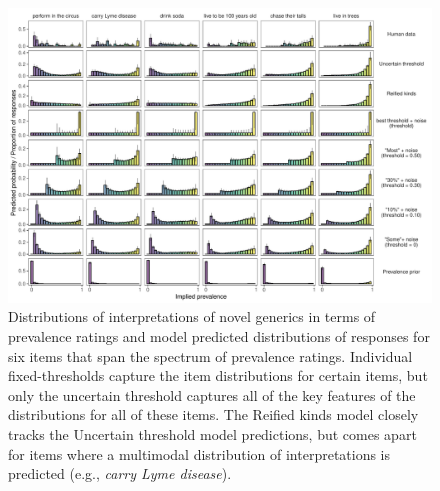 \documentclass[floatsintext,doc]{apa6}
\begin{document}
\begin{figure}
\centering
\includegraphics{figs/genint-fullDistributions-variousFixeds-1.pdf}
\caption{Distributions of interpretations of novel generics in terms of prevalence ratings and model predicted distributions of responses for six items that span the spectrum of prevalence ratings. Individual fixed-thresholds capture the item distributions for certain items, but only the uncertain threshold captures all of the key features of the distributions for all of these items. The Reified kinds model closely tracks the Uncertain threshold model predictions, but comes apart for items where a multimodal distribution of interpretations is predicted (e.g., \emph{carry Lyme disease}).
}
\label{fig:genint-modelingResults-bars}
\end{figure}
\end{document}
